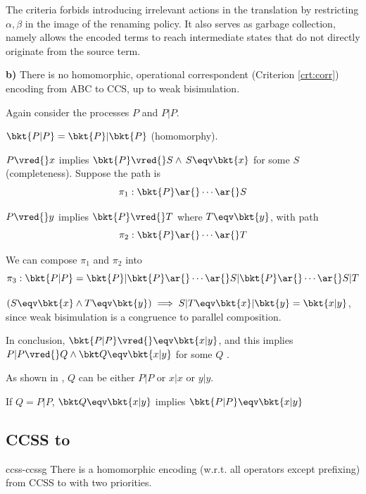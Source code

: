 The  criteria forbids introducing irrelevant actions in the translation by restricting $\alpha, \beta$ in the image of the renaming policy.
It also serves as garbage collection, namely allows the encoded terms to reach intermediate states that do not directly originate from the source term.

\textbf{b)} There is no homomorphic, operational correspondent (Criterion \ref{crt:corr}) encoding from ABC to CCS, up to weak bisimulation.

Again consider the processes $P$ and $P|P$.

$\bkt{P|P} = \bkt{P}|\bkt{P}$ \footnotesize{(homomorphy)}\normalsize.

$P\vred{}x$ implies $\bkt{P}\vred{}S \wedge\, S\eqv \bkt{x}$ for some $S$ \footnotesize{(completeness)}\normalsize.
Suppose the path is
\[
	\pi_1 : \bkt{P}\ar{}\cdots\ar{} S
\]

$P\vred{}y$ implies $\bkt{P}\vred{}T$ where $T\eqv \bkt{y}$, with path
\[
	\pi_2 : \bkt{P}\ar{}\cdots \ar{} T
\]

We can compose $\pi_1$ and $\pi_2$ into
\[
	\pi_3 : \bkt{P|P} = \bkt{P}|\bkt{P}\ar{}\cdots\ar{} S|\bkt{P} \ar{}\cdots\ar{} S|T
\]

$(S \eqv \bkt{x}\wedge T \eqv \bkt{y})\implies S|T \eqv \bkt{x}| \bkt{y} = \bkt{x|y}$, since weak bisimulation is a congruence to parallel composition.

In conclusion, $\bkt{P|P}\vred{}\eqv\bkt{x|y}$, and this implies $P|P\vred{} Q\wedge \bkt Q \eqv \bkt{x|y}$ for some $Q$ .

As shown in , $Q$ can be either $P|P$ or $x|x$ or $y|y$.

If $Q=P|P$, $\bkt Q \eqv \bkt{x|y}$ implies $\bkt{P|P}\eqv \bkt{x|y}$




\subsection{CCSS to \CSG}
\begin{proposition}{ccss-ccssg}
  There is a homomorphic encoding (w.r.t. all operators except prefixing) from CCSS to \CSG with two priorities.
\end{proposition}

